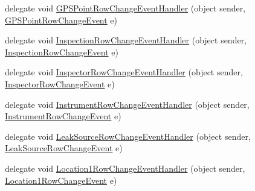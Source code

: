 \begin{DoxyCompactItemize}
\item 
delegate void \hyperlink{class_env_int_1_1_win32_1_1_field_tech_1_1_manager_1_1_data_sets_1_1_guide_ware_mobile_data_set_a5ace8b260a4d9a8220395bb6e8bf5c0f}{G\+P\+S\+Point\+Row\+Change\+Event\+Handler} (object sender, \hyperlink{class_env_int_1_1_win32_1_1_field_tech_1_1_manager_1_1_data_sets_1_1_guide_ware_mobile_data_set_baf5953e40523560f37c87dac2e88271}{G\+P\+S\+Point\+Row\+Change\+Event} e)
\item 
delegate void \hyperlink{class_env_int_1_1_win32_1_1_field_tech_1_1_manager_1_1_data_sets_1_1_guide_ware_mobile_data_set_ae19b5244eb5bea018bbc498378447759}{Inspection\+Row\+Change\+Event\+Handler} (object sender, \hyperlink{class_env_int_1_1_win32_1_1_field_tech_1_1_manager_1_1_data_sets_1_1_guide_ware_mobile_data_set_1_1_inspection_row_change_event}{Inspection\+Row\+Change\+Event} e)
\item 
delegate void \hyperlink{class_env_int_1_1_win32_1_1_field_tech_1_1_manager_1_1_data_sets_1_1_guide_ware_mobile_data_set_aeddc5131b501c25321fe024d37442034}{Inspector\+Row\+Change\+Event\+Handler} (object sender, \hyperlink{class_env_int_1_1_win32_1_1_field_tech_1_1_manager_1_1_data_sets_1_1_guide_ware_mobile_data_set_1_1_inspector_row_change_event}{Inspector\+Row\+Change\+Event} e)
\item 
delegate void \hyperlink{class_env_int_1_1_win32_1_1_field_tech_1_1_manager_1_1_data_sets_1_1_guide_ware_mobile_data_set_ad940ee36693fa300fc3113b12a98fef3}{Instrument\+Row\+Change\+Event\+Handler} (object sender, \hyperlink{class_env_int_1_1_win32_1_1_field_tech_1_1_manager_1_1_data_sets_1_1_guide_ware_mobile_data_set_1_1_instrument_row_change_event}{Instrument\+Row\+Change\+Event} e)
\item 
delegate void \hyperlink{class_env_int_1_1_win32_1_1_field_tech_1_1_manager_1_1_data_sets_1_1_guide_ware_mobile_data_set_a9dd35aa7852f0dab912fa474e360b454}{Leak\+Source\+Row\+Change\+Event\+Handler} (object sender, \hyperlink{class_env_int_1_1_win32_1_1_field_tech_1_1_manager_1_1_data_sets_1_1_guide_ware_mobile_data_set_86c0d6f3fd40b47433420931434d32a7}{Leak\+Source\+Row\+Change\+Event} e)
\item 
delegate void \hyperlink{class_env_int_1_1_win32_1_1_field_tech_1_1_manager_1_1_data_sets_1_1_guide_ware_mobile_data_set_ae3a4db5cb436e61b5641813fae964c22}{Location1\+Row\+Change\+Event\+Handler} (object sender, \hyperlink{class_env_int_1_1_win32_1_1_field_tech_1_1_manager_1_1_data_sets_1_1_guide_ware_mobile_data_set_1_1_location1_row_change_event}{Location1\+Row\+Change\+Event} e)

\end{DoxyCompactItemize}

